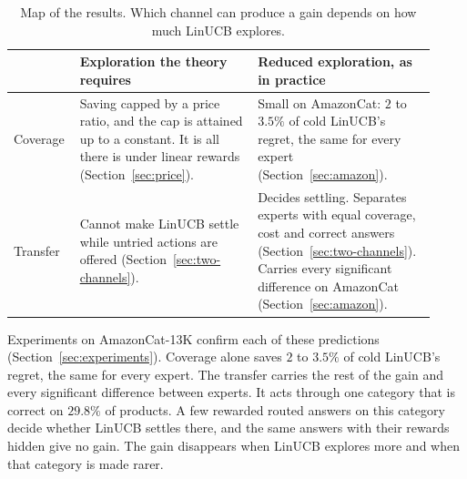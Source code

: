 \documentclass[anon]{alt2027} %
\newif\ifrevmarks\revmarkstrue
\newenvironment{revised}{\ifrevmarks\color{revcolor}\fi}{}
\begin{document}
\begin{table}[t]
\begin{revised}
\centering
\caption{Map of the results. Which channel can produce a gain depends on how
much LinUCB explores.}
\label{tab:map}
\small
\begin{tabular}{@{}p{0.12\linewidth}p{0.40\linewidth}p{0.40\linewidth}@{}}
\toprule
& Exploration the theory requires & Reduced exploration, as in practice\\
\midrule
Coverage & Saving capped by a price ratio, and the cap is attained up to a
constant. It is all there is under linear rewards (Section~\ref{sec:price}).
& Small on AmazonCat: $2$ to $3.5\%$ of cold LinUCB's regret, the same for
every expert (Section~\ref{sec:amazon}).\\
\addlinespace
Transfer & Cannot make LinUCB settle while untried actions are offered
(Section~\ref{sec:two-channels}). & Decides settling. Separates experts with
equal coverage, cost and correct answers (Section~\ref{sec:two-channels}).
Carries every significant difference on AmazonCat (Section~\ref{sec:amazon}).\\
\bottomrule
\end{tabular}
\end{revised}
\end{table}

\begin{revised}
Experiments on AmazonCat-13K confirm each of these predictions
(Section~\ref{sec:experiments}). Coverage alone saves $2$ to $3.5\%$ of cold
LinUCB's regret, the same for every expert. The transfer carries the rest of
the gain and every significant difference between experts. It acts through
one category that is correct on $29.8\%$ of products. A few rewarded routed
answers on this category decide whether LinUCB settles there, and the same
answers with their rewards hidden give no gain. The gain disappears when
LinUCB explores more and when that category is made rarer.
\end{revised}
\end{document}
